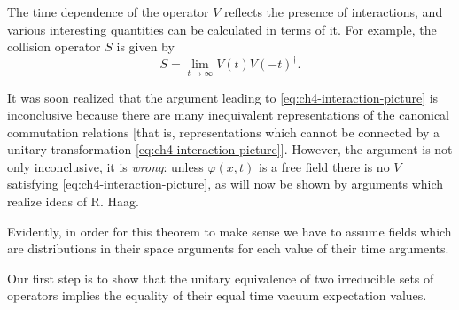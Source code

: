 The time dependence of the operator $V$ reflects the presence of
interactions, and various interesting quantities can be calculated in terms
of it.  For example, the collision operator $S$ is given by
\begin{equation*}
  S=\lim_{t\to\infty}V(t)V(-t)^\dagger.
\end{equation*}

It was soon realized that the argument leading to \eqref{eq:ch4-interaction-picture} is inconclusive
because there are many inequivalent representations of the canonical
commutation relations [that is, representations which cannot be connected by
a unitary transformation \eqref{eq:ch4-interaction-picture}].  However, the
argument is not only inconclusive, it is \emph{wrong}: unless $\varphi(x,t)$
is a free field there is no $V$ satisfying \eqref{eq:ch4-interaction-picture}, as will now be shown by
arguments which realize ideas of R. Haag.

Evidently, in order for this theorem to make sense we have to assume fields
which are distributions in their space arguments for each value of their time
arguments.

Our first step is to show that the unitary equivalence of two irreducible
sets of operators implies the equality of their equal time vacuum expectation
values.

